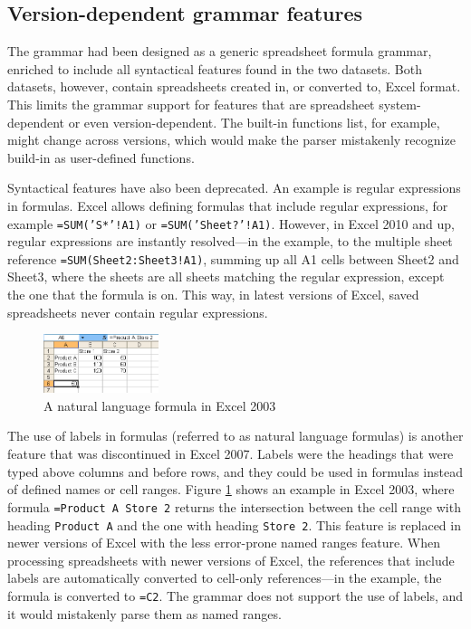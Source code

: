 \documentclass[conference]{IEEEtran}
\begin{document}
\subsection{Version-dependent grammar features}
The grammar had been designed as a generic spreadsheet formula grammar, enriched to include all syntactical features found in the two datasets. Both datasets, however, contain spreadsheets created in, or converted to, Excel format. This limits the grammar support for features that are spreadsheet system-dependent or even version-dependent. The built-in functions list, for example, might change across versions, which would make the parser mistakenly recognize build-in as user-defined functions.

Syntactical features have also been deprecated. An example is regular expressions in formulas. Excel allows defining formulas that include regular expressions, for example \texttt{=SUM('S*'!A1)} or \texttt{=SUM('Sheet?'!A1)}. However, in Excel 2010 and up, regular expressions are instantly resolved---in the example, to the multiple sheet reference \texttt{=SUM(Sheet2:Sheet3!A1)}, summing up all A1 cells between Sheet2 and Sheet3, where the sheets are all sheets matching the regular expression, except the one that the formula is on. This way, in latest versions of Excel, saved spreadsheets never contain regular expressions.
\begin{figure}
	\caption{A natural language formula in Excel 2003}
	\label{fig:labels}
	\centering
	\includegraphics[width=0.3\textwidth]{labels}
\end{figure}

The use of labels in formulas (referred to as natural language formulas) is another feature that was discontinued in Excel 2007. Labels were the headings that were typed above columns and before rows, and they could be used in formulas instead of defined names or cell ranges. Figure \ref{fig:labels} shows an example in Excel 2003, where formula \texttt{=Product A Store 2} returns the intersection between the cell range with heading \texttt{Product A} and the one with heading \texttt{Store 2}. This feature is replaced in newer versions of Excel with the less error-prone named ranges feature. When processing spreadsheets with newer versions of Excel, the references that include labels are automatically converted to cell-only references---in the example, the formula is converted to \texttt{=C2}. The grammar does not support the use of labels, and it would mistakenly parse them as named ranges.
\end{document}
